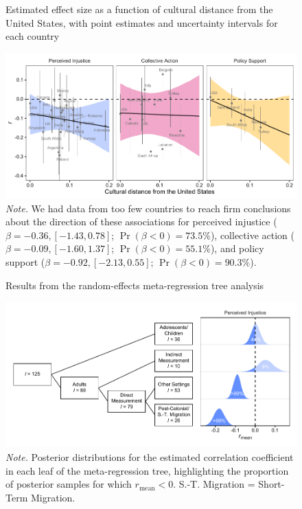 \documentclass[twocolumn, 11pt, letterpaper]{article}
\begin{document}
\begin{figure}
\centering
\caption{Estimated effect size as a function of cultural distance from the United States, with point estimates and uncertainty intervals for each country}
\includegraphics[scale=1]{../figures/figure-5}
\caption*{\textit{Note.} We had data from too few countries to reach firm conclusions about the direction of these associations for perceived injustice ($\beta = -0.36, [-1.43, 0.78]$; $\Pr (\beta < 0) = 73.5\%$), collective action ($\beta = -0.09, [-1.60, 1.37]$; $\Pr (\beta < 0) = 55.1\%$), and policy support ($\beta = -0.92, [-2.13, 0.55]$; $\Pr (\beta < 0) = 90.3\%$).}
\label{fig:f5}
\end{figure}

\begin{figure}
\centering
\caption{Results from the random-effects meta-regression tree analysis}
\includegraphics[scale=1]{../figures/figure-6}
\caption*{\textit{Note.} Posterior distributions for the estimated correlation coefficient in each leaf of the meta-regression tree, highlighting the proportion of posterior samples for which $r_\text{mean} < 0$.  S.-T. Migration = Short-Term Migration.}
\label{fig:f6}
\end{figure}
\end{document}
